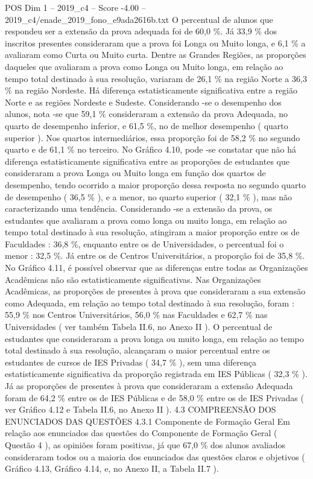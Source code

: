 \begin{textsample}{POS Dim 1 – 2019\_c4 – Score -4.00 – 2019\_c4/enade\_2019\_fono\_e9ada2616b.txt}
O percentual de alunos que respondeu ser a extensão da prova adequada foi de 60,0 \%.
Já 33,9 \% dos inscritos presentes consideraram que a prova foi Longa ou Muito longa, e 6,1 \% a avaliaram como Curta ou Muito curta.
Dentre as Grandes Regiões, as proporções daqueles que avaliaram a prova como Longa ou Muito longa, em relação ao tempo total destinado à sua resolução, variaram de 26,1 \% na região Norte a 36,3 \% na região Nordeste.
Há diferença estatisticamente significativa entre a região Norte e as regiões Nordeste e Sudeste.
Considerando -se o desempenho dos alunos, nota -se que 59,1 \% consideraram a extensão da prova Adequada, no quarto de desempenho inferior, e 61,5 \%, no de melhor desempenho ( quarto superior ).
Nos quartos intermediários, essa proporção foi de 58,2 \% no segundo quarto e de 61,1 \% no terceiro.
No Gráfico 4.10, pode -se constatar que não há diferença estatisticamente significativa entre as proporções de estudantes que consideraram a prova Longa ou Muito longa em função dos quartos de desempenho, tendo ocorrido a maior proporção dessa resposta no segundo quarto de desempenho ( 36,5 \% ), e a menor, no quarto superior ( 32,1 \% ), mas não caracterizando uma tendência.
Considerando -se a extensão da prova, os estudantes que avaliaram a prova como longa ou muito longa, em relação ao tempo total destinado à sua resolução, atingiram a maior proporção entre os de Faculdades : 36,8 \%, enquanto entre os de Universidades, o percentual foi o menor : 32,5 \%.
Já entre os de Centros Universitários, a proporção foi de 35,8 \%.
No Gráfico 4.11, é possível observar que as diferenças entre todas as Organizações Acadêmicas não são estatisticamente significativas.
Nas Organizações Acadêmicas, as proporções de presentes à prova que consideraram a sua extensão como Adequada, em relação ao tempo total destinado à sua resolução, foram : 55,9 \% nos Centros Universitários, 56,0 \% nas Faculdades e 62,7 \% nas Universidades ( ver também Tabela II.6, no Anexo II ).
O percentual de estudantes que consideraram a prova longa ou muito longa, em relação ao tempo total destinado à sua resolução, alcançaram o maior percentual entre os estudantes de cursos de IES Privadas ( 34,7 \% ), sem uma diferença estatisticamente significativa da proporção registrada em IES Públicas ( 32,3 \% ).
Já as proporções de presentes à prova que consideraram a extensão Adequada foram de 64,2 \% entre os de IES Públicas e de 58,0 \% entre os de IES Privadas ( ver Gráfico 4.12 e Tabela II.6, no Anexo II ). 4.3 COMPREENSÃO DOS ENUNCIADOS DAS QUESTÕES 4.3.1 Componente de Formação Geral Em relação aos enunciados das questões do Componente de Formação Geral ( Questão 4 ), as opiniões foram positivas, já que 67,0 \% dos alunos avaliados consideraram todos ou a maioria dos enunciados das questões claros e objetivos ( Gráfico 4.13, Gráfico 4.14, e, no Anexo II, a Tabela II.7 ).

\end{textsample}
